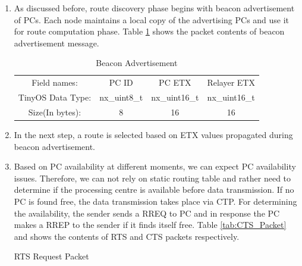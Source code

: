     \begin{enumerate}
        \item As discussed before, route discovery phase begins with beacon advertisement of \acp{PC}. Each node maintains a local copy of the advertising \acp{PC} and use it for route computation phase. Table \ref{tab:Beacon_advertisement} shows the packet contents of beacon advertisement message. 
        
        \begin{table}[h]
    	\caption{Beacon Advertisement} %
    	\centering
    	\begin{adjustbox}{max width=\textwidth}
    	
        	\begin{tabular}{|c|c|c|c|} 
        		\midrule
        		Field names: & \ac{PC} ID & \ac{PC} \ac{ETX} &Relayer \ac{ETX} \\
        	    
        	    TinyOS Data Type: & nx\_uint8\_t & nx\_uint16\_t & nx\_uint16\_t \\
        	    
        	    Size(In bytes): & 8 & 16 & 16 \\
        			
        		\hline
        		\end{tabular}
    	\end{adjustbox} 	
    	\label{tab:Beacon_advertisement}
        \end{table}
    
        \item In the next step, a route is selected based on \ac{ETX} values propagated during beacon advertisement.
        
        \item Based on \ac{PC} availability at different moments, we can expect \ac{PC} availability issues. Therefore, we can not rely on static routing table and rather need to determine if the processing centre is available before data transmission. If no \ac{PC} is found free, the data transmission takes place via \ac{CTP}. For determining the availability, the sender sends a \ac{RREQ} to \ac{PC} and in response the \ac{PC} makes a \ac{RREP} to the sender if it finds itself free. Table \ref{tab:CTS_Packet} and shows the contents of \ac{RTS} and \ac{CTS} packets respectively.
        
        \begin{table}[h]
    	\caption{RTS Request Packet} %
    	\centering
    	

\end{table}
\end{enumerate}
